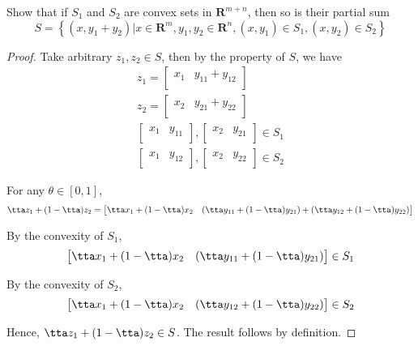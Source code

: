 
\begin{exercise}
Show that if $S_{1}$ and $S_{2}$ are convex sets in $\mathbf{R}^{m+n}$, then so is their partial sum
$$
S=\left\{\left(x, y_{1}+y_{2}\right) | x \in \mathbf{R}^{m}, y_{1}, y_{2} \in \mathbf{R}^{n},\left(x, y_{1}\right) \in S_{1},\left(x, y_{2}\right) \in S_{2}\right\}
$$
\end{exercise}
\begin{proof}
Take arbitrary $z_1,z_2 \in S$, then by the property of $S$, we have
\begin{equation}
\begin{split}
z_1 = \begin{bmatrix}x_1 & y_{11}+y_{12}\\ \end{bmatrix} \\
z_2 = \begin{bmatrix}x_2 & y_{21}+y_{22}\\ \end{bmatrix} \\
\begin{bmatrix}x_1 & y_{11}\\ \end{bmatrix}, \begin{bmatrix}x_2 & y_{21}\\ \end{bmatrix} \in S_1 \\
\begin{bmatrix}x_1 & y_{12}\\ \end{bmatrix}, \begin{bmatrix}x_2 & y_{22}\\ \end{bmatrix} \in S_2 
\end{split}
\end{equation}

For any $\theta \in [0,1]$,
$$
\tta z_1 + (1-\tta) z_2 =  \begin{bmatrix}\tta x_1 + (1-\tta) x_2 & (\tta y_{11} + (1-\tta) y_{21})+ (\tta y_{12} + (1-\tta) y_{22}) \end{bmatrix}
$$

By the convexity of $S_1$,
$$
\begin{bmatrix}\tta x_1 + (1-\tta) x_2 & (\tta y_{11} + (1-\tta) y_{21}) \end{bmatrix} \in S_1
$$

By the convexity of $S_2$,
$$
\begin{bmatrix}\tta x_1 + (1-\tta) x_2 & (\tta y_{12} + (1-\tta) y_{22}) \end{bmatrix} \in S_2
$$

Hence, $\tta z_1 + (1-\tta) z_2 \in S$. The result follows by definition.
\end{proof}